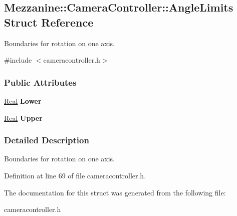\hypertarget{structMezzanine_1_1CameraController_1_1AngleLimits}{
\subsection{Mezzanine::CameraController::AngleLimits Struct Reference}
\label{structMezzanine_1_1CameraController_1_1AngleLimits}
}


Boundaries for rotation on one axis.  




{\ttfamily \#include $<$cameracontroller.h$>$}

\subsubsection*{Public Attributes}
\begin{DoxyCompactItemize}
\item 
\hypertarget{structMezzanine_1_1CameraController_1_1AngleLimits_af188823eb44a04d38cb03d1ad0bc9ad6}{
\hyperlink{namespaceMezzanine_a726731b1a7df72bf3583e4a97282c6f6}{Real} {\bfseries Lower}}
\label{structMezzanine_1_1CameraController_1_1AngleLimits_af188823eb44a04d38cb03d1ad0bc9ad6}

\item 
\hypertarget{structMezzanine_1_1CameraController_1_1AngleLimits_a504c28528664aff4a59793f67f124a1e}{
\hyperlink{namespaceMezzanine_a726731b1a7df72bf3583e4a97282c6f6}{Real} {\bfseries Upper}}
\label{structMezzanine_1_1CameraController_1_1AngleLimits_a504c28528664aff4a59793f67f124a1e}

\end{DoxyCompactItemize}


\subsubsection{Detailed Description}
Boundaries for rotation on one axis. 

Definition at line 69 of file cameracontroller.h.



The documentation for this struct was generated from the following file:\begin{DoxyCompactItemize}
\item 
cameracontroller.h\end{DoxyCompactItemize}
